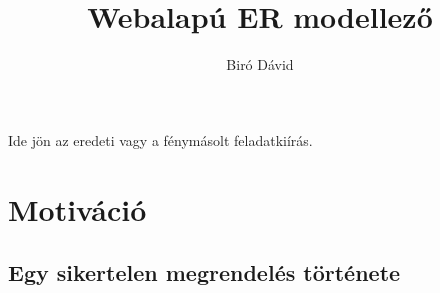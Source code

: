 \documentclass[a4paper,12pt,oneside]{report}
\title{Webalapú ER modellező}
\author{Biró Dávid}
\date{}
\begin{document}
\setcounter{chapter}{1}

\pagestyle{empty}

\newpage

\newpage
Ide jön az eredeti vagy a fénymásolt feladatkiírás.
\newpage

\newpage

\newpage

\newpage

\newpage

\renewcommand{\thefigure}{\arabic{figure}}

\setcounter{tocdepth}{3} %
\thispagestyle{empty}
\tableofcontents
\pagebreak

\setcounter{page}{1} %
\pagestyle{plain}
\fancyhead[C]{\rightmark}
\fancyfoot[R]{\thepage}
\section{Motiváció}
\subsection{Egy sikertelen megrendelés története}
\end{document}
